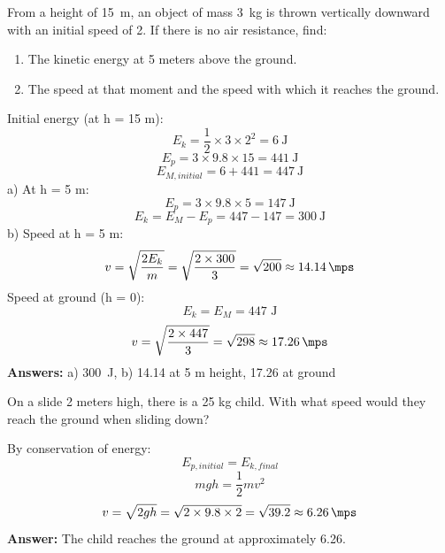 \begin{exercise}
    From a height of \qty{15}{\metre}, an object of mass \qty{3}{\kilo\gram} is thrown vertically downward with an initial speed of \qty{2}{\mps}. If there is no air resistance, find:
    \begin{enumerate}[label=\alph*)]
\item The kinetic energy at 5 meters above the ground.
\item The speed at that moment and the speed with which it reaches the ground.
    \end{enumerate}
    \begin{solu}
        Initial energy (at h = 15 m):
        \[
            E_k = \frac{1}{2} \times 3 \times 2^2 = \qty{6}{\joule}
        \]
        \[
            E_p = 3 \times 9.8 \times 15 = \qty{441}{\joule}
        \]
        \[
            E_{M,initial} = 6 + 441 = \qty{447}{\joule}
        \]
        a) At h = 5 m:
        \[
            E_p = 3 \times 9.8 \times 5 = \qty{147}{\joule}
        \]
        \[
            E_k = E_M - E_p = 447 - 147 = \qty{300}{\joule}
        \]
        b) Speed at h = 5 m:
        \[
            v = \sqrt{\frac{2E_k}{m}} = \sqrt{\frac{2 \times 300}{3}} = \sqrt{200} \approx \qty{14.14}{\mps}
        \]
        Speed at ground (h = 0):
        \[
            E_k = E_M = 447 \text{ J}
        \]
        \[
            v = \sqrt{\frac{2 \times 447}{3}} = \sqrt{298} \approx \qty{17.26}{\mps}
        \]
        \textbf{Answers:} a) \qty{300}{\joule}, b) \qty{14.14}{\mps} at 5 m height, \qty{17.26}{\mps} at ground
    \end{solu}
\end{exercise}

\begin{exercise}
    On a slide 2 meters high, there is a 25 kg child. With what speed would they reach the ground when sliding down?
    \begin{solu}
        By conservation of energy:
        \[
            E_{p,initial} = E_{k,final}
        \]
        \[
            mgh = \frac{1}{2}mv^2
        \]
        \[
            v = \sqrt{2gh} = \sqrt{2 \times 9.8 \times 2} = \sqrt{39.2} \approx \qty{6.26}{\mps}
        \]
        \textbf{Answer:} The child reaches the ground at approximately \qty{6.26}{\mps}.
    \end{solu}
\end{exercise}


